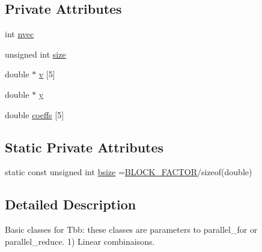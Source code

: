 \subsection*{Private Attributes}
\begin{DoxyCompactItemize}
\item 
int \hyperlink{classodes_1_1DoLinearComb_a8d6bed1c8a4303372cde7d8ad5848d68}{nvec}
\item 
unsigned int \hyperlink{classodes_1_1DoLinearComb_afe0cd5ac7e7ba7f5d38a1d686d20604d}{size}
\item 
double $\ast$ \hyperlink{classodes_1_1DoLinearComb_a0375d94ddde01ef97012bc854f178c21}{v} \mbox{[}5\mbox{]}
\item 
double $\ast$ \hyperlink{classodes_1_1DoLinearComb_aae38a367a81194099c5d3a36696f071e}{y}
\item 
double \hyperlink{classodes_1_1DoLinearComb_a1cc69496a188c64186220467afda7152}{coeffs} \mbox{[}5\mbox{]}
\end{DoxyCompactItemize}
\subsection*{Static Private Attributes}
\begin{DoxyCompactItemize}
\item 
static const unsigned int \hyperlink{classodes_1_1DoLinearComb_aa174ae87b125c39ac5afb2355efca9f2}{bsize} =\hyperlink{MacrosForCompilers_8hpp_aaa395acf51db19a6192e10ccd3c47fa2}{B\-L\-O\-C\-K\-\_\-\-F\-A\-C\-T\-O\-R}/sizeof(double)
\end{DoxyCompactItemize}


\subsection{Detailed Description}
Basic classes for Tbb\-: these classes are parameters to parallel\-\_\-for or parallel\-\_\-reduce. 1) Linear combinaisons. 

